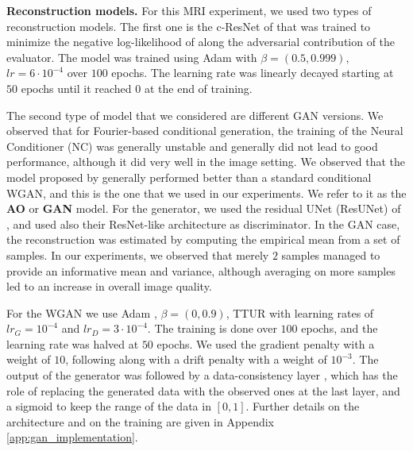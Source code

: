 \textbf{Reconstruction models.}
For this MRI experiment, we used two types of reconstruction models. The first one is the c-ResNet of \citet{zhang2019reducing} that was trained to minimize the negative log-likelihood of  along the adversarial contribution of the evaluator. The model was trained using Adam \citep{kingma2014adam} with $\beta=(0.5,0.999)$, $lr=6\cdot 10^{-4}$ over $100$ epochs. The learning rate was linearly decayed starting at $50$ epochs until it reached $0$ at the end of training.

The second type of model that we considered are different GAN versions. We observed that for Fourier-based conditional generation, the training of the Neural Conditioner (NC) \citep{belghazi2019learning} was generally unstable and generally did not lead to good performance, although it did very well in the image setting. We observed that the model proposed by \citet{adler2018deep} generally performed better than a standard conditional WGAN, and this is the one that we used in our experiments. We refer to it as the \textbf{AO} or \textbf{GAN} model. For the generator, we used the residual UNet (ResUNet) of \citet{belghazi2019learning}, and used also their ResNet-like architecture as discriminator. In the GAN case, the reconstruction was estimated by computing the empirical mean from a set of samples. In our experiments, we observed that merely $2$ samples managed to provide an informative mean and variance, although averaging on more samples led to an increase in overall image quality.

For the WGAN we use Adam \citep{kingma2014adam}, $\beta =(0,0.9)$, TTUR \citep{heusel2017gans} with learning rates of $lr_G=10^{-4}$ and $lr_D=3\cdot 10^{-4}$. The training is done over $100$ epochs, and the learning rate was halved at $50$ epochs. We used the gradient penalty \citep{gulrajani2017improved} with a weight of $10$, following  \citet{adler2018deep} along with a drift penalty with a weight of $10^{-3}$. The output of the generator was followed by a data-consistency layer \citep{schlemper2018deep, mardani2018neural}, which has the role of replacing the generated data with the observed ones at the last layer, and a sigmoid to keep the range of the data in $[0,1]$. Further details on the architecture and on the training are given in Appendix \ref{app:gan_implementation}.

